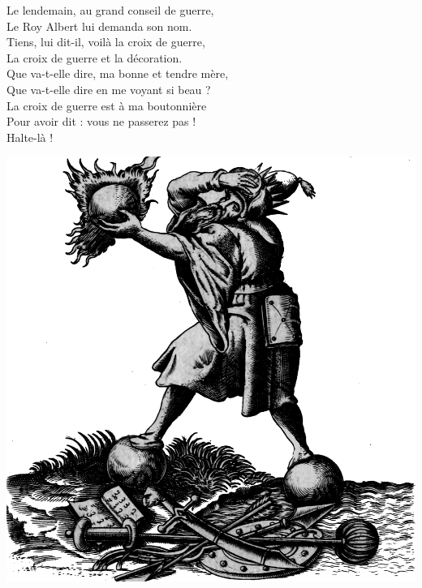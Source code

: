 \breakpage
Le lendemain, au grand conseil de guerre,
\\Le Roy Albert lui demanda son nom.
\\Tiens, lui dit-il, voilà la croix de guerre,
\\La croix de guerre et la décoration.
\\Que va-t-elle dire, ma bonne et tendre mère,
\\Que va-t-elle dire en me voyant si beau ?
\\La croix de guerre est à ma boutonnière
\\Pour avoir dit : vous ne passerez pas ! \bissimple
\\Halte-là !
\bigskip
\bigskip
\begin{center}
\centering
    \includegraphics[width=1\textwidth]{images/brev57.png}
 \end{center}

\breakpage